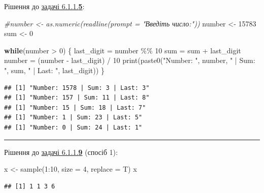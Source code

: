 \documentclass[
]{book}
\newenvironment{Shaded}{\begin{snugshade}}{\end{snugshade}}
\newcommand{\AttributeTok}[1]{\textcolor[rgb]{0.77,0.63,0.00}{#1}}
\newcommand{\CommentTok}[1]{\textcolor[rgb]{0.56,0.35,0.01}{\textit{#1}}}
\newcommand{\ControlFlowTok}[1]{\textcolor[rgb]{0.13,0.29,0.53}{\textbf{#1}}}
\newcommand{\DecValTok}[1]{\textcolor[rgb]{0.00,0.00,0.81}{#1}}
\newcommand{\FunctionTok}[1]{\textcolor[rgb]{0.00,0.00,0.00}{#1}}
\newcommand{\NormalTok}[1]{#1}
\newcommand{\OtherTok}[1]{\textcolor[rgb]{0.56,0.35,0.01}{#1}}
\newcommand{\SpecialCharTok}[1]{\textcolor[rgb]{0.00,0.00,0.00}{#1}}
\newcommand{\StringTok}[1]{\textcolor[rgb]{0.31,0.60,0.02}{#1}}
\begin{document}
Рішення до \protect\hyperlink{task6115}{задачі 6.1.1.\textbf{5}}:

\begin{Shaded}
\begin{Highlighting}[]
\CommentTok{\#number \textless{}{-} as.numeric(readline(prompt = "Введіть число:"))}
\NormalTok{number }\OtherTok{\textless{}{-}} \DecValTok{15783}
\NormalTok{sum }\OtherTok{\textless{}{-}} \DecValTok{0}

\ControlFlowTok{while}\NormalTok{(number }\SpecialCharTok{\textgreater{}} \DecValTok{0}\NormalTok{) \{}
\NormalTok{  last\_digit }\OtherTok{=}\NormalTok{ number }\SpecialCharTok{\%\%} \DecValTok{10}
\NormalTok{  sum }\OtherTok{=}\NormalTok{ sum }\SpecialCharTok{+}\NormalTok{ last\_digit}
\NormalTok{  number }\OtherTok{=}\NormalTok{ (number }\SpecialCharTok{{-}}\NormalTok{ last\_digit) }\SpecialCharTok{/} \DecValTok{10}
  \FunctionTok{print}\NormalTok{(}\FunctionTok{paste0}\NormalTok{(}\StringTok{"Number: "}\NormalTok{, number, }\StringTok{" | Sum: "}\NormalTok{, sum, }\StringTok{" | Last: "}\NormalTok{, last\_digit))}
\NormalTok{\}}
\end{Highlighting}
\end{Shaded}

\begin{verbatim}
## [1] "Number: 1578 | Sum: 3 | Last: 3"
## [1] "Number: 157 | Sum: 11 | Last: 8"
## [1] "Number: 15 | Sum: 18 | Last: 7"
## [1] "Number: 1 | Sum: 23 | Last: 5"
## [1] "Number: 0 | Sum: 24 | Last: 1"
\end{verbatim}

\begin{center}\rule{0.5\linewidth}{0.5pt}\end{center}

Рішення до \protect\hyperlink{task6119}{задачі 6.1.1.\textbf{9}} (спосіб 1):

\begin{Shaded}
\begin{Highlighting}[]
\NormalTok{x }\OtherTok{\textless{}{-}} \FunctionTok{sample}\NormalTok{(}\DecValTok{1}\SpecialCharTok{:}\DecValTok{10}\NormalTok{, }\AttributeTok{size =} \DecValTok{4}\NormalTok{, }\AttributeTok{replace =}\NormalTok{ T)}
\NormalTok{x}
\end{Highlighting}
\end{Shaded}

\begin{verbatim}
## [1] 1 1 3 6
\end{verbatim}
\end{document}
